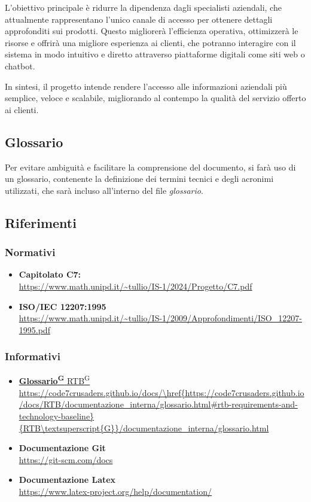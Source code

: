 L’obiettivo principale è ridurre la dipendenza dagli specialisti aziendali, che attualmente rappresentano 
l’unico canale di accesso per ottenere dettagli approfonditi sui prodotti. Questo migliorerà l’efficienza 
operativa, ottimizzerà le risorse e offrirà una migliore esperienza ai clienti, che potranno interagire con 
il sistema in modo intuitivo e diretto attraverso piattaforme digitali come siti web o chatbot.

In sintesi, il progetto intende rendere l'accesso alle informazioni aziendali più semplice, veloce e scalabile, 
migliorando al contempo la qualità del servizio offerto ai clienti.


\subsection{Glossario}
Per evitare ambiguità e facilitare la comprensione del documento, si farà uso di un glossario, 
contenente la definizione dei termini tecnici e degli acronimi utilizzati, 
che sarà incluso all'interno del file \textit{glossario}.


\subsection{Riferimenti}
\subsubsection{Normativi}
\begin{itemize}
	\item \textbf{Capitolato C7:} \\ \url{https://www.math.unipd.it/~tullio/IS-1/2024/Progetto/C7.pdf}
	\item \textbf{ISO/IEC 12207:1995} \\ \url{https://www.math.unipd.it/~tullio/IS-1/2009/Approfondimenti/ISO_12207-1995.pdf}
\end{itemize}

\subsubsection{Informativi}
\begin{itemize}
    \item\href{https://code7crusaders.github.io/docs/RTB/documentazione_interna/glossario.html#glossario}{\textbf{Glossario\textsuperscript{G}} \href{https://code7crusaders.github.io/docs/RTB/documentazione_interna/glossario.html#rtb-requirements-and-technology-baseline}{RTB}\textsuperscript{G}}\\ \url{https://code7crusaders.github.io/docs/\href{https://code7crusaders.github.io/docs/RTB/documentazione_interna/glossario.html#rtb-requirements-and-technology-baseline}{RTB\textsuperscript{G}}/documentazione_interna/glossario.html}
    \item\textbf{Documentazione Git}\\ \url{https://git-scm.com/docs}
    \item\textbf{Documentazione Latex}\\ \url{https://www.latex-project.org/help/documentation/}

\end{itemize}
